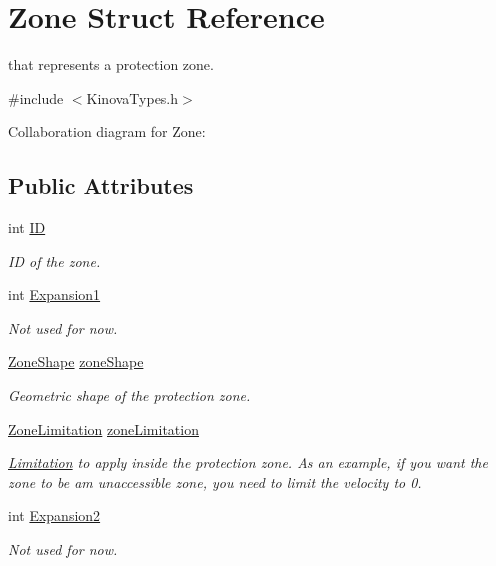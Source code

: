 \hypertarget{struct_zone}{}\section{Zone Struct Reference}
\label{struct_zone}


that represents a protection zone.  




{\ttfamily \#include $<$Kinova\+Types.\+h$>$}



Collaboration diagram for Zone\+:
\subsection*{Public Attributes}
\begin{DoxyCompactItemize}
\item 
int \hyperlink{struct_zone_ac2ca5be0d2934da5fc05d06c67caf8f0}{ID}
\begin{DoxyCompactList}\small\item\em ID of the zone. \end{DoxyCompactList}\item 
int \hyperlink{struct_zone_a8610fae6322b4d087aa0651eea3e4154}{Expansion1}
\begin{DoxyCompactList}\small\item\em Not used for now. \end{DoxyCompactList}\item 
\hyperlink{struct_zone_shape}{Zone\+Shape} \hyperlink{struct_zone_a918e45dc4df9996faeadd1366130f757}{zone\+Shape}
\begin{DoxyCompactList}\small\item\em Geometric shape of the protection zone. \end{DoxyCompactList}\item 
\hyperlink{struct_zone_limitation}{Zone\+Limitation} \hyperlink{struct_zone_ad5be3a05006633e4e2a7b2fdfdead52c}{zone\+Limitation}
\begin{DoxyCompactList}\small\item\em \hyperlink{struct_limitation}{Limitation} to apply inside the protection zone. As an example, if you want the zone to be am unaccessible zone, you need to limit the velocity to 0. \end{DoxyCompactList}\item 
int \hyperlink{struct_zone_a762759f8b82fbbfb1dbe3a1d278558f0}{Expansion2}
\begin{DoxyCompactList}\small\item\em Not used for now. \end{DoxyCompactList}\end{DoxyCompactItemize}


